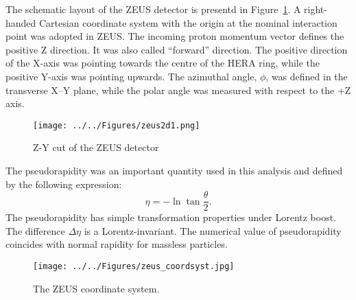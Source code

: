 The schematic layout of the ZEUS detector is presentd in Figure~\ref{fig:zeus2d1}. A right-handed Cartesian coordinate system with the origin at the nominal interaction point was adopted in ZEUS. The incoming proton momentum vector defines the positive Z direction. It was also called ``forward'' direction. The positive direction of the X-axis was pointing towards the centre of the HERA ring, while the positive Y-axis was pointing upwards. The azimuthal angle, $\phi$, was defined in the transverse X--Y plane, while the polar angle was measured with respect to the +Z axis. 
\begin{landscape}
\begin{figure}[htpb]
	\centering
		\texttt{[image: ../../Figures/zeus2d1.png]}
	\caption{Z-Y cut of the ZEUS detector}
	\label{fig:zeus2d1}
\end{figure}
\end{landscape}

The pseudorapidity was an important quantity used in this analysis and defined by the following expression:
\begin{equation}
\eta = -\ln \tan \dfrac{\theta}{2}.
\end{equation}
The pseudorapidity has simple transformation properties under Lorentz boost. The difference $\Delta \eta$ is a Lorentz-invariant. The numerical value of pseudorapidity coincides with normal rapidity for massless particles.
\begin{figure}[htpb]
	\centering
		\texttt{[image: ../../Figures/zeus\_coordsyst.jpg]}
	\caption{The ZEUS coordinate system.}
	\label{fig:zeus_coordsyst}
\end{figure}
